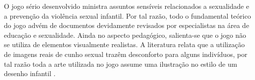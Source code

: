 O jogo sério desenvolvido ministra assuntos sensíveis relacionados a sexualidade e a prevenção da violência sexual infantil. Por tal razão, todo o fundamental teórico do jogo advém de documentos devidamente revisados por especialistas na área de educação e sexualidade. Ainda no aspecto pedagógico, salienta-se que o jogo não se utiliza de elementos visualmente realistas. %
A literatura relata que a utilização de imagens reais de cunho sexual trazêm desconforto para alguns indivíduos, por tal razão toda a arte utilizada no jogo assume uma ilustração no estilo de um desenho infantil \cite{jogo2020Albert}.






